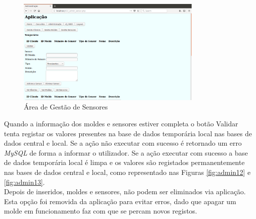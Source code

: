 \documentclass[11pt,twoside,a4paper]{report}
\begin{document}
	\begin{figure}[H]
		\centering
			\includegraphics[width=0.8\textwidth]{administracao06} %
			\caption{Área de Gestão de Sensores}
			\label{fig:admin10}
	\end{figure}
Quando a informação dos moldes e sensores estiver completa o botão Validar tenta registar os valores presentes na base de dados temporária local nas bases de dados central e local. Se a ação não executar com sucesso é retornado um erro \textit{MySQL} de forma a informar o utilizador. Se a ação executar com sucesso a base de dados temporária local é limpa e os valores são registados permanentemente nas bases de dados central e local, como representado nas Figuras \ref{fig:admin12} e \ref{fig:admin13}.\\
Depois de inseridos, moldes e sensores, não podem ser eliminados via aplicação. Esta opção foi removida da aplicação para evitar erros, dado que apagar um molde em funcionamento faz com que se percam novos registos.
\end{document}
